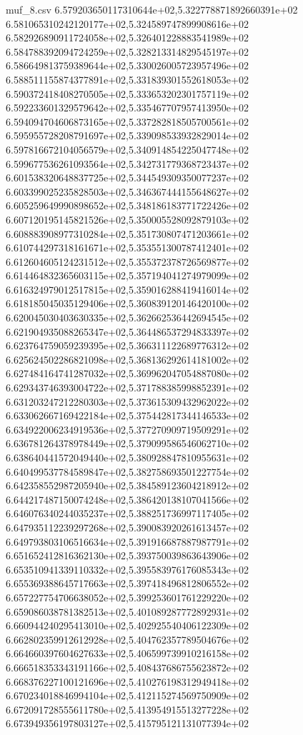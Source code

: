 \begin{filecontents*}{muf_8.csv}
6.579203650117310644e+02,5.322778871892660391e+02
6.581065310242120177e+02,5.324589747899908616e+02
6.582926890911724058e+02,5.326401228883541989e+02
6.584788392094724259e+02,5.328213314829545197e+02
6.586649813759389644e+02,5.330026005723957496e+02
6.588511155874377891e+02,5.331839301552618053e+02
6.590372418408270505e+02,5.333653202301757119e+02
6.592233601329579642e+02,5.335467707957413950e+02
6.594094704606873165e+02,5.337282818505700561e+02
6.595955728208791697e+02,5.339098533932829014e+02
6.597816672104056579e+02,5.340914854225047748e+02
6.599677536261093564e+02,5.342731779368723437e+02
6.601538320648837725e+02,5.344549309350077237e+02
6.603399025235828503e+02,5.346367444155648627e+02
6.605259649990898652e+02,5.348186183771722426e+02
6.607120195145821526e+02,5.350005528092879103e+02
6.608883908977310284e+02,5.351730807471203661e+02
6.610744297318161671e+02,5.353551300787412401e+02
6.612604605124231512e+02,5.355372378726569877e+02
6.614464832365603115e+02,5.357194041274979099e+02
6.616324979012517815e+02,5.359016288419416014e+02
6.618185045035129406e+02,5.360839120146420100e+02
6.620045030403630335e+02,5.362662536442694545e+02
6.621904935088265347e+02,5.364486537294833397e+02
6.623764759059239395e+02,5.366311122689776312e+02
6.625624502286821098e+02,5.368136292614181002e+02
6.627484164741287032e+02,5.369962047054887080e+02
6.629343746393004722e+02,5.371788385998852391e+02
6.631203247212280303e+02,5.373615309432962022e+02
6.633062667169422184e+02,5.375442817344146533e+02
6.634922006234919536e+02,5.377270909719509291e+02
6.636781264378978449e+02,5.379099586546062710e+02
6.638640441572049440e+02,5.380928847810955631e+02
6.640499537784589847e+02,5.382758693501227754e+02
6.642358552987205940e+02,5.384589123604218912e+02
6.644217487150074248e+02,5.386420138107041566e+02
6.646076340244035237e+02,5.388251736997117405e+02
6.647935112239297268e+02,5.390083920261613457e+02
6.649793803106516634e+02,5.391916687887987791e+02
6.651652412816362130e+02,5.393750039863643906e+02
6.653510941339110332e+02,5.395583976176085343e+02
6.655369388645717663e+02,5.397418496812806552e+02
6.657227754706638052e+02,5.399253601761229220e+02
6.659086038781382513e+02,5.401089287772892931e+02
6.660944240295413010e+02,5.402925540406122309e+02
6.662802359912612928e+02,5.404762357789504676e+02
6.664660397604627633e+02,5.406599739910216158e+02
6.666518353343191166e+02,5.408437686755623872e+02
6.668376227100121696e+02,5.410276198312949418e+02
6.670234018846994104e+02,5.412115274569750909e+02
6.672091728555611780e+02,5.413954915513277228e+02
6.673949356197803127e+02,5.415795121131077394e+02

\end{filecontents*}
